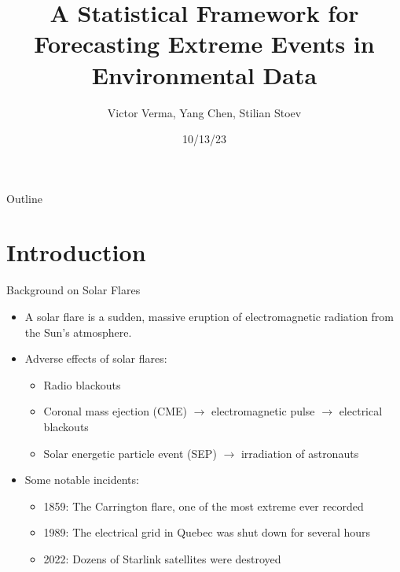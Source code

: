 \documentclass{beamer}
\title[A Statistical Framework for Forecasting \ldots]{A Statistical Framework for \\ Forecasting Extreme Events in Environmental Data}
\author{Victor Verma, Yang Chen, Stilian Stoev}
\institute[]
{
Department of Statistics \\
University of Michigan
}
\date[10/13/23]{10/13/23}
\begin{document}
\begin{frame}
    \titlepage
\end{frame}

\begin{frame}{Outline}
   \tableofcontents
\end{frame}

\section{Introduction}

\begin{frame}{Background on Solar Flares}
    \begin{itemize}
        \item A solar flare is a sudden, massive eruption of electromagnetic radiation from the Sun's atmosphere.
        \item Adverse effects of solar flares: 
        \begin{itemize}
            \item Radio blackouts
            \item Coronal mass ejection (CME) $\rightarrow$ electromagnetic pulse $\rightarrow$ electrical blackouts
            \item Solar energetic particle event (SEP) $\rightarrow$ irradiation of astronauts
        \end{itemize}
        \item Some notable incidents:
        \begin{itemize}
            \item 1859: The Carrington flare, one of the most extreme ever recorded
            \item 1989: The electrical grid in Quebec was shut down for several hours
            \item 2022: Dozens of Starlink satellites were destroyed
        \end{itemize}
    \end{itemize}
\end{frame}
\end{document}
